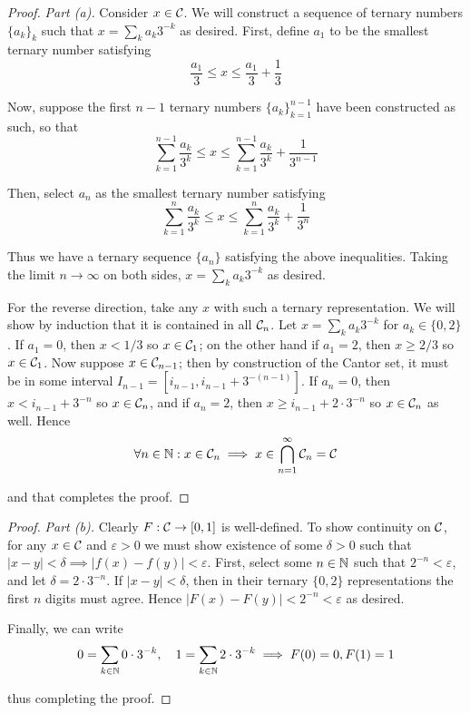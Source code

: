 \begin{proof}
    \textit{Part (a).} Consider $x \in \mathcal{C}$. We will construct a sequence of ternary numbers $\{a_k\}_k$ such that $x = \sum_k a_k 3^{-k}$ as desired. First, define $a_1$ to be the smallest ternary number satisfying 
    $$
        \frac{a_1}{3} \leq x \leq \frac{a_1}{3} + \frac{1}{3}
    $$

    Now, suppose the first $n-1$ ternary numbers $\{a_k\}_{k=1}^{n-1}$ have been constructed as such, so that 
    $$
    \sum_{k=1}^{n-1} \frac{a_k}{3^k} \leq x \leq \sum_{k=1}^{n-1} \frac{a_k}{3^k} + \frac{1}{3^{n-1}}
    $$

    Then, select $a_n$ as the smallest ternary number satisfying 
    $$
    \sum_{k=1}^{n} \frac{a_k}{3^k} \leq x \leq \sum_{k=1}^n \frac{a_k}{3^k} + \frac{1}{3^n}
    $$

    Thus we have a ternary sequence $\{a_n\}$ satisfying the above inequalities. Taking the limit $n \to \infty$ on both sides, $x = \sum_k a_k 3^{-k}$ as desired. 
    \stdvspace

    For the reverse direction, take any $x$ with such a ternary representation. We will show by induction that it is contained in all $\mathcal{C}_n$. Let $x = \sum_k a_k 3^{-k}$ for $a_k\in \{0, 2\}$. If $a_1 = 0$, then $x < 1/3$ so $x \in \mathcal{C}_1$; on the other hand if $a_1 = 2$, then $x \geq 2/3$ so $x \in \mathcal{C}_1$. Now suppose $x \in \mathcal{C}_{n-1}$; then by construction of the Cantor set, it must be in some interval $I_{n-1} = [i_{n-1}, i_{n-1} + 3^{-(n-1)}]$. If $a_n = 0$, then $x < i_{n-1} + 3^{-n}$ so $x \in \mathcal{C}_n$, and if $a_n = 2$, then $x \geq i_{n-1} + 2 \cdot 3^{-n}$ so $x \in \mathcal{C}_n$ as well. Hence
    $$
    \forall n \in \mathbb{N} : x \in \mathcal{C}_n \implies x \in \bigcap_{n=1}^\infty \mathcal{C}_n = \mathcal{C}
    $$

    and that completes the proof. 
\end{proof}

\begin{proof}
    \textit{Part (b).} Clearly $F : \mathcal{C} \to [0, 1]$ is well-defined. To show continuity on $\mathcal{C}$, for any $x \in \mathcal{C}$ and $\varepsilon > 0$ we must show existence of some $\delta > 0$ such that $|x - y| < \delta \implies |f(x) - f(y)| < \varepsilon$. First, select some $n \in \mathbb{N}$ such that $2^{-n} < \varepsilon$, and let $\delta = 2 \cdot 3^{-n}$. If $|x - y| < \delta$, then in their ternary $\{0, 2\}$ representations the first $n$ digits must agree. Hence $|F(x) - F(y)| < 2^{-n} < \varepsilon$ as desired. 
    \stdvspace

    Finally, we can write 
    $$
    0 = \sum_{k \in \mathbb{N}} 0 \cdot 3^{-k}, \quad 1 = \sum_{k \in \mathbb{N}} 2 \cdot 3^{-k}
    \implies F(0) = 0, F(1) = 1
    $$

    thus completing the proof. 
\end{proof}

